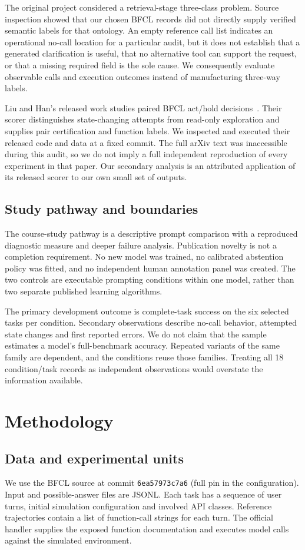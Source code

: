 \documentclass[conference]{IEEEtran}
\newcommand{\code}[1]{\texttt{#1}}
\begin{document}
The original project considered a retrieval-stage three-class problem. Source inspection showed that our chosen BFCL records did not directly supply verified semantic labels for that ontology. An empty reference call list indicates an operational no-call location for a particular audit, but it does not establish that a generated clarification is useful, that no alternative tool can support the request, or that a missing required field is the sole cause. We consequently evaluate observable calls and execution outcomes instead of manufacturing three-way labels.

Liu and Han's released work studies paired BFCL act/hold decisions~\cite{liu2026asking}. Their scorer distinguishes state-changing attempts from read-only exploration and supplies pair certification and function labels. We inspected and executed their released code and data at a fixed commit. The full arXiv text was inaccessible during this audit, so we do not imply a full independent reproduction of every experiment in that paper. Our secondary analysis is an attributed application of its released scorer to our own small set of outputs.

\subsection{Study pathway and boundaries}
The course-study pathway is a descriptive prompt comparison with a reproduced diagnostic measure and deeper failure analysis. Publication novelty is not a completion requirement. No new model was trained, no calibrated abstention policy was fitted, and no independent human annotation panel was created. The two controls are executable prompting conditions within one model, rather than two separate published learning algorithms.

The primary development outcome is complete-task success on the six selected tasks per condition. Secondary observations describe no-call behavior, attempted state changes and first reported errors. We do not claim that the sample estimates a model's full-benchmark accuracy. Repeated variants of the same family are dependent, and the conditions reuse those families. Treating all 18 condition/task records as independent observations would overstate the information available.

\section{Methodology}
\subsection{Data and experimental units}
We use the BFCL source at commit \code{6ea57973c7a6} (full pin in the configuration). Input and possible-answer files are JSONL. Each task has a sequence of user turns, initial simulation configuration and involved API classes. Reference trajectories contain a list of function-call strings for each turn. The official handler supplies the exposed function documentation and executes model calls against the simulated environment.
\end{document}
